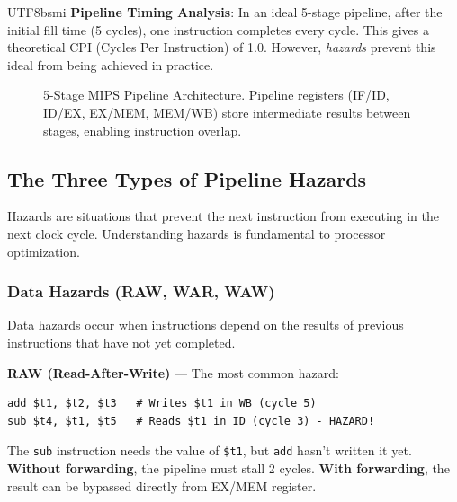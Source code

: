 \documentclass[journal,twoside]{IEEEtran}
\begin{document}
\begin{CJK}{UTF8}{bsmi}
\textbf{Pipeline Timing Analysis}: In an ideal 5-stage pipeline, after the initial fill time (5 cycles), one instruction completes every cycle. This gives a theoretical CPI (Cycles Per Instruction) of 1.0. However, \textit{hazards} prevent this ideal from being achieved in practice.

\begin{figure}[!t]
\centering
{}
\caption{5-Stage MIPS Pipeline Architecture. Pipeline registers (IF/ID, ID/EX, EX/MEM, MEM/WB) store intermediate results between stages, enabling instruction overlap.}
\label{fig:pipeline}
\end{figure}

\subsection{The Three Types of Pipeline Hazards}
Hazards are situations that prevent the next instruction from executing in the next clock cycle. Understanding hazards is fundamental to processor optimization.

\subsubsection{Data Hazards (RAW, WAR, WAW)}
Data hazards occur when instructions depend on the results of previous instructions that have not yet completed.

\textbf{RAW (Read-After-Write)} --- The most common hazard:
\begin{lstlisting}
add $t1, $t2, $t3   # Writes $t1 in WB (cycle 5)
sub $t4, $t1, $t5   # Reads $t1 in ID (cycle 3) - HAZARD!
\end{lstlisting}
The \texttt{sub} instruction needs the value of \texttt{\$t1}, but \texttt{add} hasn't written it yet. \textbf{Without forwarding}, the pipeline must stall 2 cycles. \textbf{With forwarding}, the result can be bypassed directly from EX/MEM register.


\end{CJK}
\end{document}

